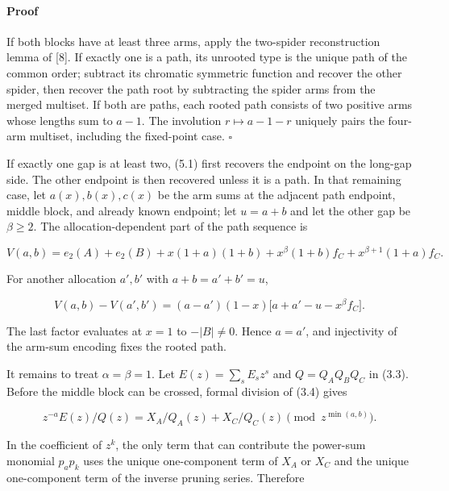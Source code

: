 \documentclass[11pt]{article}
\begin{document}
\paragraph{Proof}


If both blocks have at least three arms, apply the two-spider reconstruction lemma of [8]. If exactly
one is a path, its unrooted type is the unique path of the common order; subtract its chromatic
symmetric function and recover the other spider, then recover the path root by subtracting the
spider arms from the merged multiset. If both are paths, each rooted path consists of two positive
arms whose lengths sum to $a-1$. The involution $r\mapsto a-1-r$ uniquely pairs the four-arm
multiset, including the fixed-point case. $\square$

If exactly one gap is at least two, (5.1) first recovers the endpoint on the long-gap side. The
other endpoint is then recovered unless it is a path. In that remaining case, let $a(x),b(x),c(x)$
be the arm sums at the adjacent path endpoint, middle block, and already known endpoint; let
$u=a+b$ and let the other gap be $\beta\geq2$. The allocation-dependent part of the path sequence is

\begin{equation*}
V(a,b)=e_2(A)+e_2(B)+x(1+a)(1+b)
+x^\beta(1+b)f_C+x^{\beta+1}(1+a)f_C.
\tag{5.4}
\end{equation*}


For another allocation $a',b'$ with $a+b=a'+b'=u$,

\begin{equation*}
V(a,b)-V(a',b')=(a-a')(1-x)
\bigl[a+a'-u-x^\beta f_C\bigr].
\tag{5.5}
\end{equation*}


The last factor evaluates at $x=1$ to $-|B|\neq0$. Hence $a=a'$, and injectivity of the arm-sum
encoding fixes the rooted path.

It remains to treat $\alpha=\beta=1$. Let $E(z)=\sum_sE_s z^s$ and $Q=Q_AQ_BQ_C$ in
(3.3). Before the middle block can be crossed, formal division of (3.4) gives

\begin{equation*}
z^{-a}E(z)/Q(z)=X_A/Q_A(z)+X_C/Q_C(z)
\pmod {z^{\min(a,b)}}.
\tag{5.6}
\end{equation*}


In the coefficient of $z^k$, the only term that can contribute the power-sum monomial $p_ap_k$
uses the unique one-component term of $X_A$ or $X_C$ and the unique one-component term of the
inverse pruning series. Therefore
\end{document}
